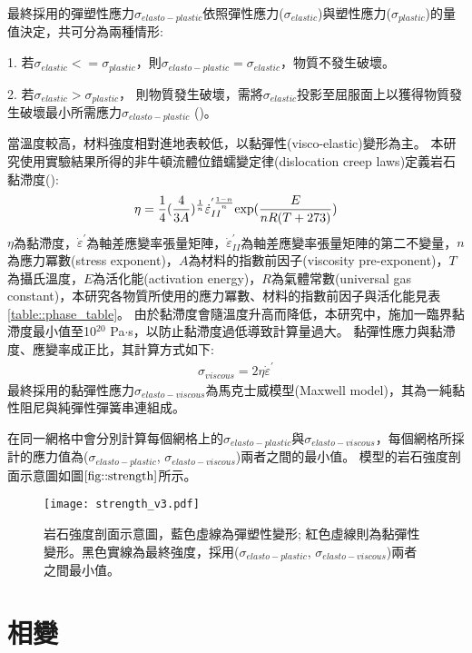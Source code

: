最終採用的彈塑性應力$\sigma_{elasto-plastic}$依照彈性應力($\sigma_{elastic}$)與塑性應力($\sigma_{plastic}$)的量值決定，共可分為兩種情形:

1. 若$\sigma_{elastic} <= \sigma_{plastic}$，則$ \sigma_{elasto-plastic} = \sigma_{elastic}$，物質不發生破壞。

2. 若$\sigma_{elastic} > \sigma_{plastic}$， 則物質發生破壞，需將$\sigma_{elastic}$投影至屈服面上以獲得物質發生破壞最小所需應力$\sigma_{elasto-plastic}$ (\citealp{simo2006computational})。

當溫度較高，材料強度相對進地表較低，以黏彈性(visco-elastic)變形為主。
本研究使用實驗結果所得的非牛頓流體位錯蠕變定律(dislocation creep laws)定義岩石黏滯度(\citealp{Chen1990}):
\begin{align}
   \eta=\frac{1}{4}(\frac{4}{3A})^{\frac{1}{n}} \dot\varepsilon_{II}^{' \frac{1-n}{n}} {\rm exp}(\frac{E}{nR(T+273)})
   \label{eqn:viscousity}
\end{align}
$\eta$為黏滯度，$\dot\varepsilon^{'}$為軸差應變率張量矩陣，$\dot\varepsilon_{II}^{'}$為軸差應變率張量矩陣的第二不變量，$n$為應力冪數(stress exponent)，$A$為材料的指數前因子(viscosity pre-exponent)，$T$為攝氏溫度，$E$為活化能(activation energy)，$R$為氣體常數(universal gas constant)，本研究各物質所使用的應力冪數、材料的指數前因子與活化能見表\ref{table::phase_table}。
由於黏滯度會隨溫度升高而降低，本研究中，施加一臨界黏滯度最小值至10$^{20}$ Pa$\cdot$s，以防止黏滯度過低導致計算量過大。
黏彈性應力與黏滯度、應變率成正比，其計算方式如下:
\begin{align}
    \sigma_{viscous} = 2\eta\dot\varepsilon^{'} \label{eqn:viscous tensor}
\end{align}
最終採用的黏彈性應力$\sigma_{elasto-viscous}$為馬克士威模型(Maxwell model)，其為一純黏性阻尼與純彈性彈簧串連組成。

在同一網格中會分別計算每個網格上的$\sigma_{elasto-plastic}$與$\sigma_{elasto-viscous}$，每個網格所採計的應力值為($\sigma_{elasto-plastic}$, $\sigma_{elasto-viscous}$)兩者之間的最小值。
模型的岩石強度剖面示意圖如圖$\ref{fig::strength}$所示。
\begin{figure*}[ht!]
    \centering
    \texttt{[image: strength\_v3.pdf]}
    \caption[岩石強度剖面示意圖]{岩石強度剖面示意圖，藍色虛線為彈塑性變形; 紅色虛線則為黏彈性變形。黑色實線為最終強度，採用($\sigma_{elasto-plastic}$, $\sigma_{elasto-viscous}$)兩者之間最小值。}
    \label{fig::strength}
\end{figure*}

\section{相變}\label{相變}

